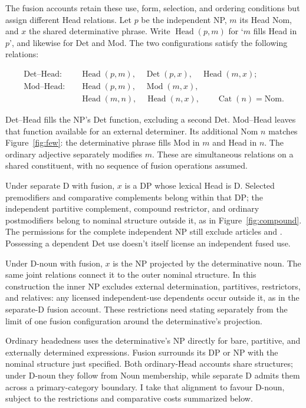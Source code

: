 \documentclass[12pt]{article}
\begin{document}
The fusion accounts retain these use, form, selection, and ordering conditions but assign different Head relations. Let $p$ be the independent NP, $m$ its Head Nom, and $x$ the shared determinative phrase. Write $\operatorname{Head}(p,m)$ for \enquote*{$m$ fills Head in $p$}, and likewise for Det and Mod. The two configurations satisfy the following relations:

\[
\begin{aligned}
\text{Det--Head:}\quad
 &\operatorname{Head}(p,m),\quad \operatorname{Det}(p,x),\quad \operatorname{Head}(m,x); \\
\text{Mod--Head:}\quad
 &\operatorname{Head}(p,m),\quad \operatorname{Mod}(m,x),\\
 &\operatorname{Head}(m,n),\quad \operatorname{Head}(n,x),\qquad \operatorname{Cat}(n)=\mathrm{Nom}.
\end{aligned}
\]

Det--Head fills the NP's Det function, excluding a second Det. Mod--Head leaves that function available for an external determiner. Its additional Nom $n$ matches Figure~\ref{fig:few}: the determinative phrase fills Mod in $m$ and Head in $n$. The ordinary adjective  separately modifies $m$. These are simultaneous relations on a shared constituent, with no sequence of fusion operations assumed.

Under separate D with fusion, $x$ is a DP whose lexical Head is D. Selected premodifiers and comparative complements belong within that DP; the independent partitive complement, compound restrictor, and ordinary postmodifiers belong to nominal structure outside it, as in Figure~\ref{fig:compound}. The permissions for the complete independent NP still exclude articles and . Possessing a dependent Det use doesn't itself license an independent fused use.

Under D-noun with fusion, $x$ is the NP projected by the determinative noun. The same joint relations connect it to the outer nominal structure. In this construction the inner NP excludes external determination, partitives, restrictors, and relatives: any licensed independent-use dependents occur outside it, as in the separate-D fusion account. These restrictions need stating separately from the limit of one fusion configuration around the determinative's projection.

Ordinary headedness uses the determinative's NP directly for bare, partitive, and externally determined expressions. Fusion surrounds its DP or NP with the nominal structure just specified. Both ordinary-Head accounts share structures; under D-noun they follow from Noun membership, while separate D admits them across a primary-category boundary. I take that alignment to favour D-noun, subject to the restrictions and comparative costs summarized below.
\end{document}
